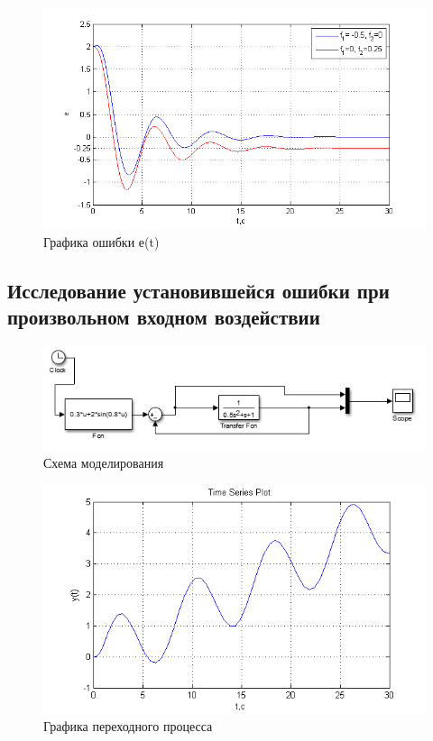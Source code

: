 \documentclass[a4paper, 10pt]{article}
\begin{document}
\newpage
\begin{figure}[h]
	\centering
	\includegraphics[width=0.7\linewidth]{13}
	\caption{Графика ошибки е(t)}
	\label{fig:13}
\end{figure}
\clearpage
\begin{center}
\section{Исследование установившейся ошибки при произвольном входном воздействии}\hfill\par
\end{center}
\begin{center}
	\begin{figure}[h]
		\centering
	\includegraphics[width=0.7\linewidth]{14}
		\caption{Схема моделирования}
		\label{fig:14}
	\end{figure}
\end{center}

\begin{figure}[h]
	\centering
	\includegraphics[width=0.7\linewidth]{15}
	\caption{Графика переходного процесса}
	\label{fig:15}
\end{figure}
\end{document}

